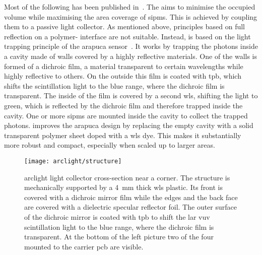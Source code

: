 Most of the following has been published in~\cite{arclight}.
The \AL{} aims to minimise the occupied volume while maximising the area coverage of \glspl{sipm}.
This is achieved by coupling them to a passive light collector.
As mentioned above, principles based on full reflection on a polymer-\lar{} interface are not suitable.
Instead, \AL{} is based on the light trapping principle of the \gls{arapuca} sensor~\cite{arapuca}.
It works by trapping the photons inside a cavity made of walls covered by a highly reflective materials.
One of the walls is formed of a dichroic film, a material transparent to certain wavelengths while highly reflective to others.
On the outside this film is coated with \gls{tpb}, which shifts the \lar{} scintillation light to the blue range, where the dichroic film is transparent.
The inside of the film is covered by a second \gls{wls}, shifting the light to green, which is reflected by the dichroic film and therefore trapped inside the cavity.
One or more \glspl{sipm} are mounted inside the cavity to collect the trapped photons.
\AL{} improves the \gls{arapuca} design by replacing the empty cavity with a solid transparent polymer sheet doped with a \gls{wls} dye.
This makes it substantially more robust and compact, especially when scaled up to larger areas.

\begin{figure}[tbp]
	\centering
	\texttt{[image: arclight/structure]}
	\caption[ light collector cross-section]{%
		\acrshort{arclight} light collector cross-section near a corner.
		The structure is mechanically supported by a \SI{4}{\milli\metre} thick \acrshort{wls} plastic.
		Its front is covered with a dichroic mirror film while the edges and the back face are covered with a dielectric specular reflector foil.
		The outer surface of the dichroic mirror is coated with \acrshort{tpb} to shift the \acrshort{lar} \acrshort{vuv} scintillation light to the blue range, where the dichroic film is transparent.
		At the bottom of the left picture two of the four  mounted to the carrier \acrshort{pcb} are visible.
	}
	\label{fig:arclight_structure}
\end{figure}

